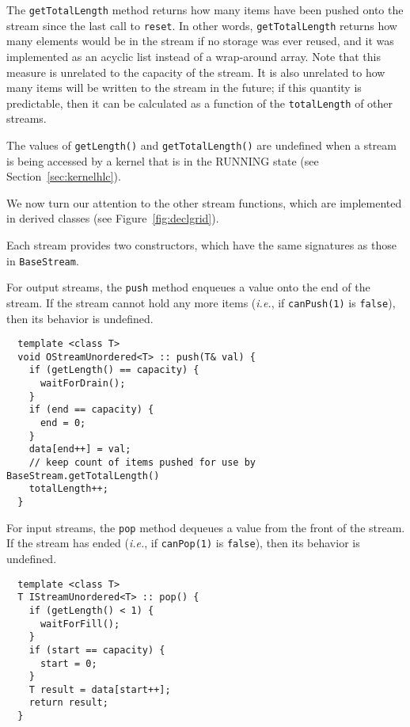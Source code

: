 The {\tt getTotalLength} method returns how many items have been
pushed onto the stream since the last call to {\tt reset}.  In other
words, {\tt getTotalLength} returns how many elements would be in the
stream if no storage was ever reused, and it was implemented as an
acyclic list instead of a wrap-around array.  Note that this measure
is unrelated to the capacity of the stream.  It is also unrelated to
how many items will be written to the stream in the future; if this
quantity is predictable, then it can be calculated as a function of
the {\tt totalLength} of other streams.

The values of {\tt getLength()} and {\tt getTotalLength()} are
undefined when a stream is being accessed by a kernel that is in the
RUNNING state (see Section~\ref{sec:kernelhlc}).

\newpage
{}

We now turn our attention to the other stream functions, which are
implemented in derived classes (see Figure~\ref{fig:declgrid}).

 Each stream provides two constructors, which have
the same signatures as those in {\tt BaseStream}.

 For output streams, the {\tt push} method enqueues a value
onto the end of the stream.  If the stream cannot hold any more items
({\it i.e.}, if {\tt canPush(1)} is {\tt false}), then its behavior is
undefined.

{\small
\begin{verbatim}
  template <class T>
  void OStreamUnordered<T> :: push(T& val) {
    if (getLength() == capacity) {
      waitForDrain();
    }
    if (end == capacity) {
      end = 0;
    }
    data[end++] = val;
    // keep count of items pushed for use by BaseStream.getTotalLength()
    totalLength++;
  }
\end{verbatim}}

 For input streams, the {\tt pop} method dequeues a value
from the front of the stream.  If the stream has ended ({\it i.e.}, if
{\tt canPop(1)} is {\tt false}), then its behavior is undefined.

{\small
\begin{verbatim}
  template <class T>
  T IStreamUnordered<T> :: pop() {
    if (getLength() < 1) {
      waitForFill();
    }
    if (start == capacity) {
      start = 0;
    }
    T result = data[start++];
    return result;
  }
\end{verbatim}}

